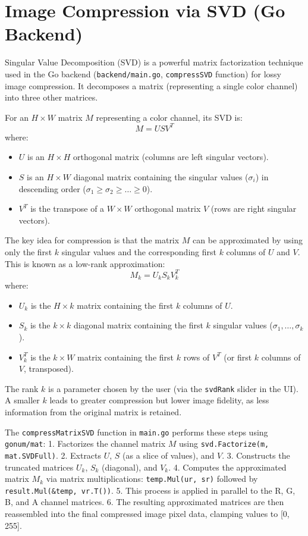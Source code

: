 \documentclass{article}
\begin{document}
\section{Image Compression via SVD (Go Backend)}

Singular Value Decomposition (SVD) is a powerful matrix factorization technique used in the Go backend (\texttt{backend/main.go}, \texttt{compressSVD} function) for lossy image compression. It decomposes a matrix (representing a single color channel) into three other matrices.

For an $H \times W$ matrix $M$ representing a color channel, its SVD is:
\[ M = U S V^T \]
where:
\begin{itemize}
    \item $U$ is an $H \times H$ orthogonal matrix (columns are left singular vectors).
    \item $S$ is an $H \times W$ diagonal matrix containing the singular values ($\sigma_i$) in descending order ($\sigma_1 \ge \sigma_2 \ge \dots \ge 0$).
    \item $V^T$ is the transpose of a $W \times W$ orthogonal matrix $V$ (rows are right singular vectors).
\end{itemize}

The key idea for compression is that the matrix $M$ can be approximated by using only the first $k$ singular values and the corresponding first $k$ columns of $U$ and $V$. This is known as a low-rank approximation:
\[ M_k = U_k S_k V_k^T \]
where:
\begin{itemize}
    \item $U_k$ is the $H \times k$ matrix containing the first $k$ columns of $U$.
    \item $S_k$ is the $k \times k$ diagonal matrix containing the first $k$ singular values ($\sigma_1, \dots, \sigma_k$).
    \item $V_k^T$ is the $k \times W$ matrix containing the first $k$ rows of $V^T$ (or first $k$ columns of $V$, transposed).
\end{itemize}
The rank $k$ is a parameter chosen by the user (via the \texttt{svdRank} slider in the UI). A smaller $k$ leads to greater compression but lower image fidelity, as less information from the original matrix is retained.

The \texttt{compressMatrixSVD} function in \texttt{main.go} performs these steps using \texttt{gonum/mat}:
1.  Factorizes the channel matrix $M$ using \texttt{svd.Factorize(m, mat.SVDFull)}.
2.  Extracts $U$, $S$ (as a slice of values), and $V$.
3.  Constructs the truncated matrices $U_k$, $S_k$ (diagonal), and $V_k$.
4.  Computes the approximated matrix $M_k$ via matrix multiplications: \texttt{temp.Mul(ur, sr)} followed by \texttt{result.Mul(\&temp, vr.T())}.
5.  This process is applied in parallel to the R, G, B, and A channel matrices.
6.  The resulting approximated matrices are then reassembled into the final compressed image pixel data, clamping values to [0, 255].
\end{document}
